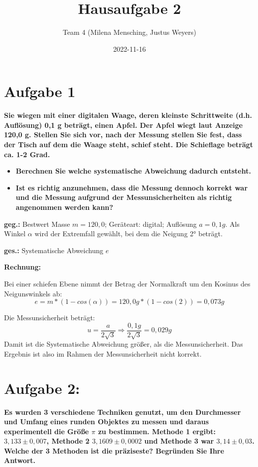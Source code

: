 \documentclass[
]{article}
\title{Hausaufgabe 2}
\author{Team 4 (Milena Mensching, Justus Weyers)}
\date{2022-11-16}
\providecommand{\tightlist}{%
  \setlength{\itemsep}{0pt}\setlength{\parskip}{0pt}}
\begin{document}
\maketitle

\hypertarget{aufgabe-1}{%
\section{Aufgabe 1}\label{aufgabe-1}}

\textbf{Sie wiegen mit einer digitalen Waage, deren kleinste
Schrittweite (d.h. Auflösung) 0,1 g beträgt, einen Apfel. Der Apfel
wiegt laut Anzeige 120,0 g. Stellen Sie sich vor, nach der Messung
stellen Sie fest, dass der Tisch auf dem die Waage steht, schief steht.
Die Schieflage beträgt ca. 1-2 Grad.}

\begin{itemize}
\tightlist
\item
  \textbf{Berechnen Sie welche systematische Abweichung dadurch
  entsteht.}
\item
  \textbf{Ist es richtig anzunehmen, dass die Messung dennoch korrekt
  war und die Messung aufgrund der Messunsicherheiten als richtig
  angenommen werden kann?}
\end{itemize}

\textbf{geg.:} Bestwert Masse \(m = 120,0\); Geräteart: digital;
Auflösung \(a=0,1g\). Als Winkel \(\alpha\) wird der Extremfall gewählt,
bei dem die Neigung 2° beträgt.

\textbf{ges.:} Systematische Abweichung \(e\)

\textbf{Rechnung:}

Bei einer schiefen Ebene nimmt der Betrag der Normalkraft um den Kosinus
des Neigunswinkels ab:
\[e = m*(1-cos(\alpha)) = 120,0g*(1-cos(2)) = 0,073g\]

Die Messunsicherheit beträgt:
\[ u = \frac{a}{2\sqrt{3}} \Rightarrow \frac{0,1g}{2\sqrt{3}} = 0,029g\]
Damit ist die Systematische Abweichung größer, als die Messunsicherheit.
Das Ergebnis ist also im Rahmen der Messunsicherheit nicht korrekt.

\hypertarget{aufgabe-2}{%
\section{Aufgabe 2:}\label{aufgabe-2}}

\textbf{Es wurden 3 verschiedene Techniken genutzt, um den Durchmesser
und Umfang eines runden Objektes zu messen und daraus experimentell die
Größe \(\pi\) zu bestimmen. Methode 1 ergibt: \(3,133 \pm 0,007\),
Methode 2 \(3,1609 \pm 0,0002\) und Methode 3 war \(3,14 \pm 0,03\).
Welche der 3 Methoden ist die präziseste? Begründen Sie Ihre Antwort.}
\end{document}

